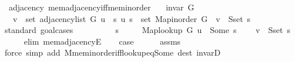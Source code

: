 \begin{isabellebody}
\endisatagproof
{\isafoldproof}%
%
\isadelimproof
\isanewline
%
\endisadelimproof
%
\isadeliminvisible
\isanewline
%
\endisadeliminvisible
%
\isataginvisible
{}\isamarkupfalse%
\ {\isacharparenleft}{\kern0pt}\ adjacency{\isacharparenright}{\kern0pt}\ mem{\isacharunderscore}{\kern0pt}adjacency{\isacharunderscore}{\kern0pt}iff{\isacharunderscore}{\kern0pt}mem{\isacharunderscore}{\kern0pt}inorder{\isacharcolon}{\kern0pt}\isanewline
\ \ \ {\isachardoublequoteopen}invar\ G{\isachardoublequoteclose}\isanewline
\ \ \ {\isachardoublequoteopen}v\ {\isasymin}\ set\ {\isacharparenleft}{\kern0pt}adjacency{\isacharunderscore}{\kern0pt}list\ G\ u{\isacharparenright}{\kern0pt}\ {\isasymlongleftrightarrow}\ {\isacharparenleft}{\kern0pt}{\isasymexists}s{\isachardot}{\kern0pt}\ {\isacharparenleft}{\kern0pt}u{\isacharcomma}{\kern0pt}\ s{\isacharparenright}{\kern0pt}\ {\isasymin}\ set\ {\isacharparenleft}{\kern0pt}Map{\isacharunderscore}{\kern0pt}inorder\ G{\isacharparenright}{\kern0pt}\ {\isasymand}\ v\ {\isasymin}\ S{\isachardot}{\kern0pt}set\ s{\isacharparenright}{\kern0pt}{\isachardoublequoteclose}%
\endisataginvisible
{\isafoldinvisible}%
%
\isadeliminvisible
\isanewline
%
\endisadeliminvisible
%
\isadelimproof
%
\endisadelimproof
%
\isatagproof
{}\isamarkupfalse%
\ {\isacharparenleft}{\kern0pt}standard{\isacharcomma}{\kern0pt}\ goal{\isacharunderscore}{\kern0pt}cases{\isacharparenright}{\kern0pt}\isanewline
\ \ \isamarkupfalse%
\ {}\isanewline
\ \ \isamarkupfalse%
\ \isamarkupfalse%
\ s\ \isanewline
\ \ \ \ {\isachardoublequoteopen}Map{\isacharunderscore}{\kern0pt}lookup\ G\ u\ {\isacharequal}{\kern0pt}\ Some\ s{\isachardoublequoteclose}\isanewline
\ \ \ \ {\isachardoublequoteopen}v\ {\isasymin}\ S{\isachardot}{\kern0pt}set\ s{\isachardoublequoteclose}\isanewline
\ \ \ \ \isamarkupfalse%
\ {\isacharparenleft}{\kern0pt}elim\ mem{\isacharunderscore}{\kern0pt}adjacencyE{\isacharparenright}{\kern0pt}\isanewline
\ \ \isamarkupfalse%
\ {\isacharquery}{\kern0pt}case\isanewline
\ \ \ \ \isamarkupfalse%
\ assms\isanewline
\ \ \ \ \isamarkupfalse%
\ {\isacharparenleft}{\kern0pt}force\ simp\ add{\isacharcolon}{\kern0pt}\ M{\isachardot}{\kern0pt}mem{\isacharunderscore}{\kern0pt}inorder{\isacharunderscore}{\kern0pt}iff{\isacharunderscore}{\kern0pt}lookup{\isacharunderscore}{\kern0pt}eq{\isacharunderscore}{\kern0pt}Some\ dest{\isacharcolon}{\kern0pt}\ invarD{\isacharparenleft}{\kern0pt}{}{\isacharparenright}{\kern0pt}{\isacharparenright}{\kern0pt}\isanewline

\end{isabellebody}
